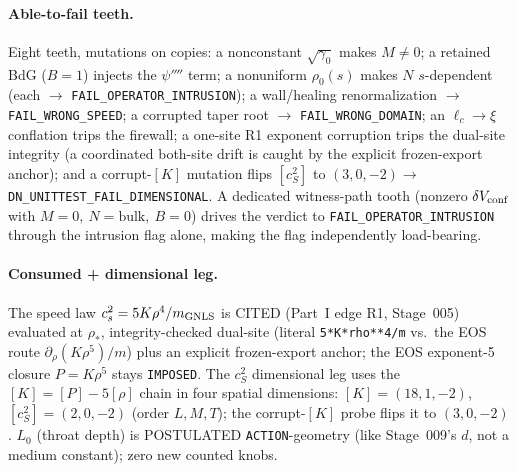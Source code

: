 \paragraph{Able-to-fail teeth.}
Eight teeth, mutations on copies: a nonconstant \(\sqrt{\gamma_0}\) makes
\(M\neq0\); a retained BdG (\(B=1\)) injects the \(\psi''''\) term; a nonuniform
\(\rho_0(s)\) makes \(N\) \(s\)-dependent (each \(\to\)
\texttt{FAIL\_OPERATOR\_INTRUSION}); a wall/healing renormalization \(\to\)
\texttt{FAIL\_WRONG\_SPEED}; a corrupted taper root \(\to\)
\texttt{FAIL\_WRONG\_DOMAIN}; an \(\ell_c\!\to\!\xi\) conflation trips the
firewall; a one-site R1 exponent corruption trips the dual-site integrity (a
coordinated both-site drift is caught by the explicit frozen-export anchor); and
a corrupt-\([K]\) mutation flips \([c_S^2]\) to \((3,0,-2)\to\)
\texttt{DN\_UNITTEST\_FAIL\_DIMENSIONAL}. A dedicated witness-path tooth
(nonzero \(\delta V_{\rm conf}\) with \(M=0,\ N=\text{bulk},\ B=0\)) drives the
verdict to \texttt{FAIL\_OPERATOR\_INTRUSION} through the intrusion flag alone,
making the flag independently load-bearing.

\paragraph{Consumed + dimensional leg.}
The speed law \(c_s^2=5K\rho^4/m_{\rm GNLS}\) is CITED (Part~I edge R1,
Stage~005) evaluated at \(\rho_*\), integrity-checked dual-site (literal
\texttt{5*K*rho**4/m} vs.\ the EOS route \(\partial_\rho(K\rho^5)/m\)) plus an
explicit frozen-export anchor; the EOS exponent-5 closure \(P=K\rho^5\) stays
\texttt{IMPOSED}. The \(c_S^2\) dimensional leg uses the \([K]=[P]-5[\rho]\)
chain in four spatial dimensions: \([K]=(18,1,-2)\), \([c_S^2]=(2,0,-2)\) (order
\(L,M,T\)); the corrupt-\([K]\) probe flips it to \((3,0,-2)\). \(L_0\) (throat
depth) is POSTULATED \texttt{ACTION}-geometry (like Stage~009's \(d\), not a
medium constant); zero new counted knobs.

